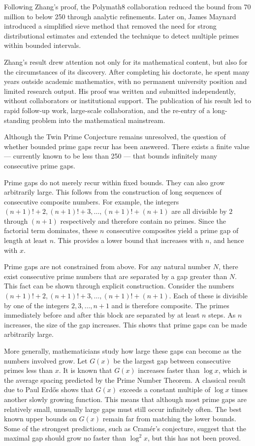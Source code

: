 Following Zhang's proof, the Polymath8 collaboration reduced the bound from 70 million to below 250 through analytic refinements. Later on, James Maynard introduced a simplified sieve method that removed the need for strong distributional estimates and extended the technique to detect multiple primes within bounded intervals.

Zhang's result drew attention not only for its mathematical content, but also for the circumstances of its discovery. After completing his doctorate, he spent many years outside academic mathematics, with no permanent university position and limited research output. His proof was written and submitted independently, without collaborators or institutional support. The publication of his result led to rapid follow-up work, large-scale collaboration, and the re-entry of a long-standing problem into the mathematical mainstream.

Although the Twin Prime Conjecture remains unresolved, the question of whether bounded prime gaps recur has been answered. There exists a finite value — currently known to be less than 250 — that bounds infinitely many consecutive prime gaps.

Prime gaps do not merely recur within fixed bounds. They can also grow arbitrarily large. This follows from the construction of long sequences of consecutive composite numbers. For example, the integers $(n+1)! + 2,  (n+1)! + 3,  \dots,  (n+1)! + (n+1)$ are all divisible by $2$ through $(n+1)$ respectively and therefore contain no primes. Since the factorial term dominates, these $n$ consecutive composites yield a prime gap of length at least $n$. This provides a lower bound that increases with $n$, and hence with $x$.

Prime gaps are not constrained from above. For any natural number $N$, there exist consecutive prime numbers that are separated by a gap greater than $N$. This fact can be shown through explicit construction. Consider the numbers $(n+1)! + 2,  (n+1)! + 3,  \dots,  (n+1)! + (n+1).$ Each of these is divisible by one of the integers $2, 3, \dots, n+1$ and is therefore composite. The primes immediately before and after this block are separated by at least $n$ steps. As $n$ increases, the size of the gap increases. This shows that prime gaps can be made arbitrarily large.

More generally, mathematicians study how large these gaps can become as the numbers involved grow. Let $G(x)$ be the largest gap between consecutive primes less than $x$. It is known that $G(x)$ increases faster than $\log x$, which is the average spacing predicted by the Prime Number Theorem. A classical result due to Paul Erdős shows that $G(x)$ exceeds a constant multiple of $\log x$ times another slowly growing function. This means that although most prime gaps are relatively small, unusually large gaps must still occur infinitely often. The best known upper bounds on $G(x)$ remain far from matching the lower bounds. Some of the strongest predictions, such as Cramér's conjecture, suggest that the maximal gap should grow no faster than $\log^2 x$, but this has not been proved.

